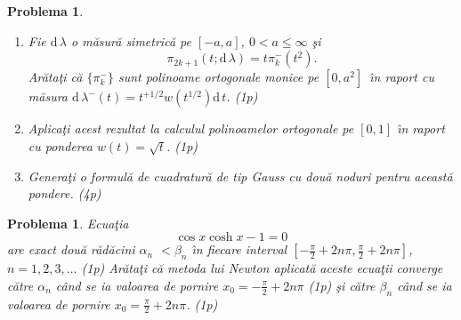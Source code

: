 \documentclass[a4paper]{article}%
\newtheorem{problem}[theorem]{Problema}
\begin{document}
\begin{problem}
\label{pb4.35b}

\begin{enumerate}
\item[(a)] Fie $\mathrm{d\,}\lambda$ o m\u{a}sur\u{a} simetric\u{a} pe
$[-a,a]$, $0<a\leq\infty$ \c{s}i
\[
\pi_{2k+1}(t;\mathrm{d\,}\lambda)=t\pi_{k}^{-}(t^{2}).
\]
Ar\u{a}ta\c{t}i c\u{a} $\{\pi_{k}^{-}\}$ sunt polinoame ortogonale monice pe
$[0,a^{2}]$\ \^{\i}n raport cu m\u{a}sura $\mathrm{d\,}\lambda^{-}%
(t)=t^{+1/2}w(t^{1/2})\mathrm{d\,}t$. (1p)

\item[(b)] Aplica\c{t}i acest rezultat la calculul polinoamelor ortogonale pe
$[0,1]$ \^{\i}n raport cu ponderea $w(t)=\sqrt{t}$. (1p)

\item[(c)] Genera\c{t}i o formul\u{a} de cuadratur\u{a} de tip Gauss cu
dou\u{a} noduri pentru aceast\u{a} pondere. (4p)
\end{enumerate}
\end{problem}

\begin{problem}
\label{Gautschip4.30}Ecua\c{t}ia
\[
\cos x\cosh x-1=0
\]
are exact dou\u{a} r\u{a}d\u{a}cini $\alpha_{n}$ $<\beta_{n}$ \^{\i}n fiecare
interval $\left[  -\frac{\pi}{2}+2n\pi,\frac{\pi}{2}+2n\pi\right]  $,
$n=1,2,3,\dots$ (1p) Ar\u{a}ta\c{t}i c\u{a} metoda lui Newton aplicat\u{a}
aceste ecua\c{t}ii converge c\u{a}tre $\alpha_{n}$ c\^{a}nd se ia valoarea de
pornire $x_{0}=-\frac{\pi}{2}+2n\pi$ (1p) \c{s}i c\u{a}tre $\beta_{n}$
c\^{a}nd se ia valoarea de pornire $x_{0}=\frac{\pi}{2}+2n\pi$. (1p)
\end{problem}
\end{document}
